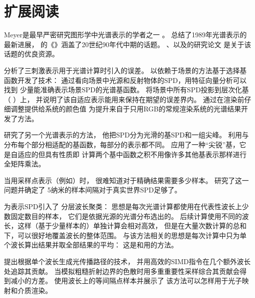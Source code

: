 \section{扩展阅读}\label{sec:扩展阅读05}

Meyer是最早严密研究图形学中光谱表示的学者之一
\citep{10.1145/800250.807502}\citep{10.1145/7529.7920}。
\citet{10.1007/978-1-4612-3526-2}总结了1989年光谱表示的最新进展，
\citet{GLASSNER1995}的《》涵盖了20世纪90年代中期的话题。
\citet{773962}、\citet{773963}以及\citet{10.2312:egst.20021054}的研究论文
是关于该话题的优良资源。

\citet{10.1145/122718.122729}分析了三刺激表示用于光谱计算时引入的误差。
\citet{10.1145/166117.166142}以依赖于场景的方法基于选择基函数开发了技术：
通过看向场景中光源和反射物体的SPD，用特征向量分析可以找到
少量能准确表示场景SPD的光谱基函数。
\citet{10.1007/978-3-7091-6858-5_12}将场景中所有SPD投影到层次化基
（
）上，
并说明了该自适应表示能用来保持在期望的误差界内。
\citet{10.2312:EGWR:EGWR02:117-124}通过在渲染前仔细调整提供给系统的颜色值
为提升来自于只用RGB的常规渲染系统的光谱结果开发了方法。

\citet{Sun2001}研究了另一个光谱表示的方法，
他把SPD分为光滑的基SPD和一组尖峰。
利用与分布每个部分相适配的基函数，每部分的表示都不同。
\citet{Drew:03}应用了一种“尖锐”基，它是自适应的但具有性质即
计算两个基中函数之积不用像许多其他基表示那样进行全矩阵乘法。

当用采样点表示（例如）时，
很难知道对于精确结果需要多少样本。
\citet{Lehtonen:06}研究了这一问题并确定了
5纳米的样本间隔对于真实世界SPD足够了。

\citet{Evans:1999:10.20380/GI1999.07}为表示SPD引入了
分层波长聚类：
思想是每次光谱计算都使用在代表性波长上少数固定数目的样本，
它们是依据光源的光谱分布选出的。
后续计算使用不同的波长，这样（基于少量样本的）单独计算会相对高效，
但是在大量次数计算的总和下，可以很好地覆盖波长的整体范围。
与该方法相关的思想是每次计算中只为单个波长算出结果并取全部结果的平均：
这是\citet{10.1145/256157.256158,}和\citet{Morley:2006:}用的方法。

\citet{Radziszewski2009}提出根据单个波长生成光传播路径的技术，
并用高效的SIMD指令在几个额外波长处追踪其贡献。
当模拟粗糙折射边界的色散时用多重重要性采样综合其贡献会得到减小的方差。
\citet{10.1111/cgf.12419}使用波长上的等间隔点样本并展示了
该方法可以怎样用于光子映射和介质渲染。

